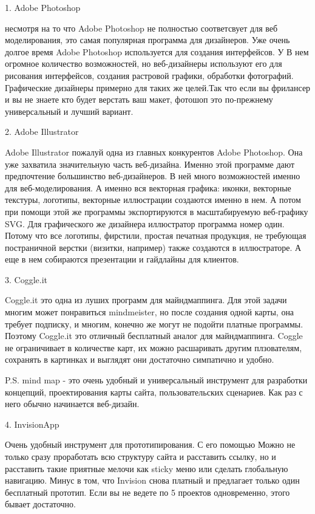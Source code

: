 \documentclass[10pt,twoside,slovak,a4paper]{article}
\begin{document}
1. Adobe Photoshop

несмотря на то что Adobe Photoshop не полностью соответсвует для веб моделирования, это самая популярная программа для дизайнеров. Уже очень долгое время Adobe Photoshop используется для создания интерфейсов. У В нем огромное количество возможностей, но веб-дизайнеры используют его для рисования интерфейсов, создания растровой графики, обработки фотографий. Графические дизайнеры примерно для таких же целей.Так что если вы фрилансер и вы не знаете кто будет верстать ваш макет, фотошоп это по-прежнему универсальный и лучший вариант.

2. Adobe Illustrator

Adobe Illustrator пожалуй одна из главных конкурентов Adobe Photoshop. Она уже захватила значительную часть веб-дизайна. Именно этой программе дают предпочтение большинство веб-дизайнеров. В ней много возможностей именно для веб-моделирования. А именно вся векторная графика: иконки, векторные текстуры, логотипы, векторные иллюстрации создаются именно в нем. А потом при помощи этой же программы экспортируются в масштабируемую веб-графику SVG. Для графического же дизайнера иллюстратор программа номер один. Потому что все логотипы, фирстили, простая печатная продукция, не требующая постраничной верстки (визитки, например) также создаются в иллюстраторе. А еще в нем собираются презентации и гайдлайны для клиентов.

3. Coggle.it

Coggle.it это одна из луших программ для майндмаппинга. Для этой задачи многим может понравиться mindmeister, но после создания одной карты, она требует подписку, и многим, конечно же могут не подойти платные программы. Поэтому Coggle.it это отличный бесплатный аналог для майндмаппинга. Coggle не ограничивает в количестве карт, их можно расшаривать другим плзователям, сохранять в картинках и выглядят они достаточно симпатично и удобно.

P.S. mind map - это очень удобный и универсальный инструмент для разработки концепций, проектирования карты сайта, пользовательских сценариев. Как раз с него обычно начинается веб-дизайн.

4. InvisionApp

Очень удобный инструмент для прототипирования. С его помощью Можно не только сразу проработать всю структуру сайта и расставить ссылку, но и расставить такие приятные мелочи как sticky меню или сделать глобальную навигацию. Минус в том, что Invision снова платный и предлагает только один бесплатный прототип. Если вы не ведете по 5 проектов одновременно, этого бывает достаточно.
\end{document}
